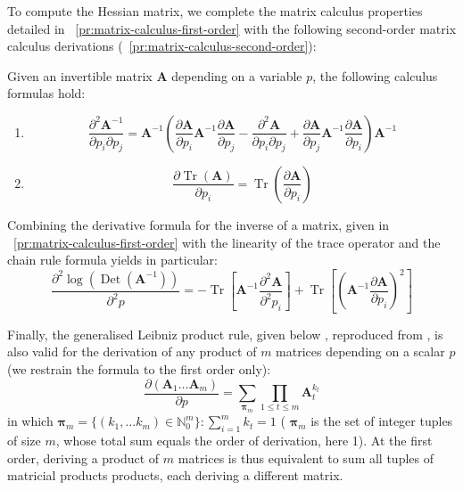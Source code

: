 \documentclass[long, final]{jobim}
\DeclareMathOperator*{\Tr}{Tr}
\DeclareMathOperator*{\DET}{Det}
\begin{document}
To compute the Hessian matrix, we complete the matrix calculus properties detailed in \propertyname~\ref{pr:matrix-calculus-first-order} with the following second-order matrix calculus derivations (\propertyname~\ref{pr:matrix-calculus-second-order}):

\begin{property}
\label{pr:matrix-calculus-second-order}
Given an invertible matrix $\boldsymbol{A}$ depending on a variable $p$, the following calculus formulas hold:
\begin{multicols}{2}
\begin{enumerate}[label=(\alph*)]
\item
$$ \frac{\partial^2 \boldsymbol{A}^{-1}}{\partial p_i \partial p_j} =  \boldsymbol{A}^{-1} \left( \frac{\partial \boldsymbol{A}}{\partial p_i } \boldsymbol{A}^{-1} \frac{\partial \boldsymbol{A}}{\partial p_j} - \frac{\partial^2 \boldsymbol{A}}{\partial p_i \partial p_j}  + \frac{\partial \boldsymbol{A}}{\partial p_j } \boldsymbol{A}^{-1} \frac{\partial \boldsymbol{A}}{\partial p_i}\right) \boldsymbol{A}^{-1}
$$
\item
$$
\frac{\partial \Tr \left(\boldsymbol{A}\right)}{\partial p_i} = \Tr  \left(\frac{\partial \boldsymbol{A}}{\partial p_i}\right)
$$


\end{enumerate}
\end{multicols}

Combining the derivative formula for the inverse of a matrix, given in \propertyname~\ref{pr:matrix-calculus-first-order} with the linearity of the trace operator and the chain rule formula yields in particular:
\begin{equation*}
    \frac{\partial^2 \log \left(\DET (\boldsymbol{A}^{-1})\right)}{\partial^2 p} = - \Tr  \left[\boldsymbol{A}^{-1}\frac{\partial^2 \boldsymbol{A}}{\partial^2 p_i}\right] +
\Tr  \left[\left(\boldsymbol{A}^{-1}\frac{\partial \boldsymbol{A}}{\partial p_i}\right)^2\right]
\end{equation*}


Finally, the generalised Leibniz product rule, given below , reproduced from \cite{mulla20}, is also valid for the derivation of any product of $m$ matrices depending on a scalar $p$ (we restrain the formula to the first order only):
\begin{equation*}
    \frac{\partial (\boldsymbol{A}_1 \ldots \boldsymbol{A}_m)}{\partial p} = \sum_{\boldsymbol{\pi}_m} \prod_{1\leq t \leq m}  \boldsymbol{A}_t^{k_t}
\end{equation*}
in which $\boldsymbol{\pi}_m = \{(k_1, \ldots k_m) \in \mathbb{N}_0^m \}: \sum_{i=1}^m k_t = 1$ ( $\boldsymbol{\pi}_m$ is the set of integer tuples of size $m$, whose total sum equals the order of derivation, here 1). At the first order, deriving a product of $m$ matrices is thus equivalent to sum all tuples of matricial products products, each deriving a different matrix.
\end{property}
\end{document}
